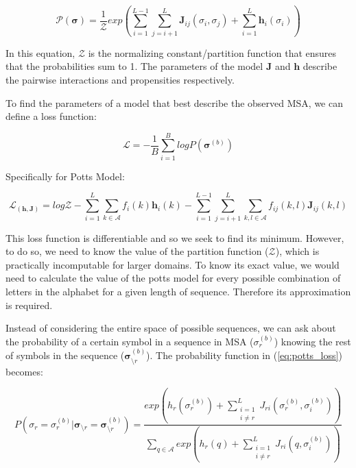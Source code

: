 \begin{equation}
    \mathcal{P}(\bm{\sigma}) = \frac{1}{\mathcal{Z}} exp\left(\sum_{i = 1}^{L-1} \sum_{j=i+1}^L \bm{J}_{ij}(\sigma_i, \sigma_j) + \sum_{i=1}^L \bm{h}_i({\sigma_i})\right)
    \label{eq:Potts}
\end{equation}
    
In this equation, $\mathcal{Z}$ is the normalizing constant/partition function that ensures that the probabilities sum to 1. 
The parameters of the model $\bm{J}$ and $\bm{h}$ describe the pairwise interactions and propensities respectively.
        
To find the parameters of a model that best describe the observed MSA, we can define a loss function:
        
\begin{equation}
    \mathcal{L} = -\frac{1}{B} \sum_{i=1}^B logP(\bm{\sigma}^{(b)})
    \label{eq:potts_loss}
\end{equation}
        
Specifically for Potts Model: 
        
\begin{equation}
    \mathcal{L}_(\bm{h}, \bm{J}) = log \mathcal{Z} - \sum_{i = 1}^L \sum_{k \in \mathcal{A}} f_i(k)\bm{h}_i(k) - \sum_{i = 1}^{L-1} \sum_{j=i+1}^L \sum_{k, l \in \mathcal{A}} f_{ij}(k, l) \bm{J}_{ij}(k, l)
    \label{potts_loss_ml}
\end{equation}
        
This loss function is differentiable and so we seek to find its minimum. 
However, to do so, we need to know the value of the partition function ($\mathcal{Z}$), which is practically incomputable for larger domains. To know its exact value, we would need to calculate the value of the potts model for every possible combination of letters in the alphabet for a given length of sequence. 
Therefore its approximation is required.
        
Instead of considering the entire space of possible sequences, we can ask about the probability of a certain symbol in a sequence in MSA ($\sigma_r^{(b)}$) knowing the rest of symbols in the sequence ($\bm{\sigma}_{\setminus r}^{(b)}$). 
The probability function in (\ref{eq:potts_loss}) becomes:
        
$$
P(\sigma_{r} = \sigma_r^{(b)} | \bm{\sigma}_{\setminus r} = \bm{\sigma}_{\setminus r}^{(b)}) = \frac{exp \left(h_r (\sigma_r^{(b)}) + \sum_{\substack{i = 1\\i\neq r}}^L J_{ri}(\sigma_r^{(b)}, \sigma_i^{(b)})\right)}{\sum_{q \in \mathcal{A}} exp \left(h_r(q) + \sum_{\substack{i = 1\\i\neq r}}^L J_{ri}(q, \sigma_i^{(b)})\right)}$$
        

